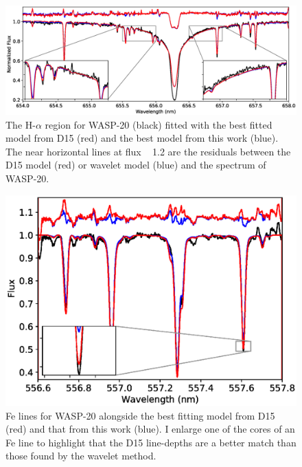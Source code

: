   \begin{figure}[ht!]
\centering
\includegraphics[width=\textwidth, height = 0.4\textwidth]{5-images/WASP20-halpha.eps}
\caption{The H-$\alpha$ region for WASP-20 (black) fitted with the best fitted model from D15 (red) and the best model from this work (blue). The near horizontal lines at flux ~ 1.2 are the residuals between the D15 model (red) or wavelet model (blue) and the spectrum of WASP-20.}
\label{wavelet:fig:WASP-20Halpha}
\end{figure}


\begin{figure}[ht!]
\centering
\includegraphics[width=\textwidth]{5-images/Felines}
\caption{Fe lines for WASP-20 alongside the best fitting model from D15 (red) and that from this work (blue). I enlarge one of the cores of an Fe line to highlight that the D15 line-depths are a better match than those found by the wavelet method. }
\label{wavelet:fig:FElines}
\end{figure}


